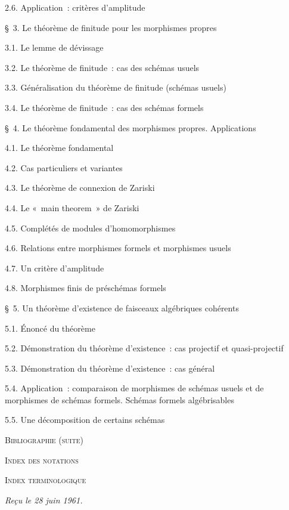 \begin{flushleft}
2.6. Application~: critères d'amplitude 

\medskip
\S~3. Le théorème de finitude pour les morphismes propres 

3.1. Le lemme de dévissage 

3.2. Le théorème de finitude~: cas des schémas usuels 

3.3. Généralisation du théorème de finitude (schémas usuels) 

3.4. Le théorème de finitude~: cas des schémas formels 

\medskip
\S~4. Le théorème fondamental des morphismes propres. Applications 

4.1. Le théorème fondamental 

4.2. Cas particuliers et variantes 

4.3. Le théorème de connexion de Zariski 

4.4. Le «~main theorem~» de Zariski 

4.5. Complétés de modules d'homomorphismes 

4.6. Relations entre morphismes formels et morphismes usuels 

4.7. Un critère d'amplitude 

4.8. Morphismes finis de préschémas formels 


\S~5. Un théorème d'existence de faisceaux algébriques cohérents 

5.1. Énoncé du théorème 

5.2. Démonstration du théorème d'existence~: cas projectif et quasi-projectif

5.3. Démonstration du théorème d'existence~: cas général 

5.4. Application~: comparaison de morphismes de schémas usuels et de
morphismes de schémas formels. Schémas formels algébrisables 

5.5. Une décomposition de certains schémas 

\medskip
\textsc{Bibliographie (suite)} 

\textsc{Index des notations} 

\textsc{Index terminologique} 

\begin{flushright}
\emph{Reçu le 28 juin 1961.}
\end{flushright}
\end{flushleft}
